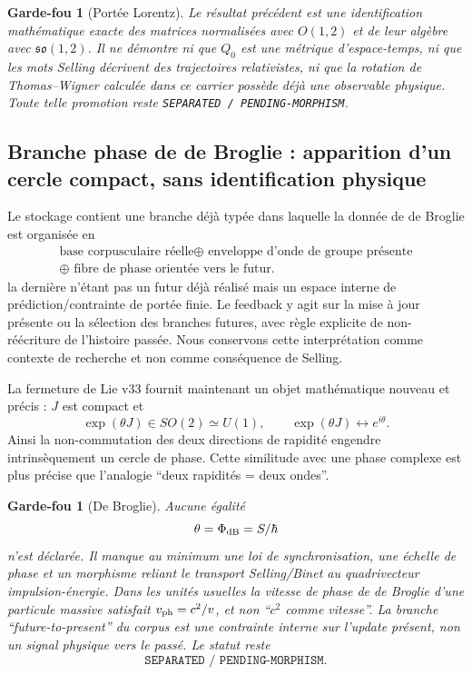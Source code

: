 \documentclass[11pt,a4paper]{article}
\newtheorem{guardrail}[theorem]{Garde-fou}
\begin{document}
\begin{guardrail}[Portée Lorentz]
Le résultat précédent est une identification mathématique exacte des matrices normalisées avec
$O(1,2)$ et de leur algèbre avec $\mathfrak{so}(1,2)$. Il ne démontre ni que $Q_0$ est une métrique
d'espace-temps, ni que les mots Selling décrivent des trajectoires relativistes, ni que la rotation
de Thomas--Wigner calculée dans ce carrier possède déjà une observable physique. Toute telle
promotion reste \texttt{SEPARATED / PENDING-MORPHISM}.
\end{guardrail}

\subsection{Branche phase de de Broglie : apparition d'un cercle compact, sans identification physique}

Le stockage contient une branche déjà typée dans laquelle la donnée de de Broglie est organisée en
\[
 \begin{gathered}
 \text{base corpusculaire réelle}
 \oplus\text{ enveloppe d'onde de groupe présente}\\
 \oplus\text{ fibre de phase orientée vers le futur}.
 \end{gathered}
\]
la dernière n'étant pas un futur déjà réalisé mais un espace interne de prédiction/contrainte de
portée finie. Le feedback y agit sur la mise à jour présente ou la sélection des branches futures,
avec règle explicite de non-réécriture de l'histoire passée. Nous conservons cette interprétation
comme contexte de recherche et non comme conséquence de Selling.

La fermeture de Lie v33 fournit maintenant un objet mathématique nouveau et précis : $J$ est
compact et
\begin{equation}\label{eq:v33-phase-circle}
 \boxed{
 \exp(\theta J)\in SO(2)
 \simeq U(1),
 \qquad
 \exp(\theta J)\longleftrightarrow e^{i\theta}.}
\end{equation}
Ainsi la non-commutation des deux directions de rapidité engendre intrinsèquement un cercle de
phase. Cette similitude avec une phase complexe est plus précise que l'analogie ``deux rapidités =
deux ondes''.

\begin{guardrail}[De Broglie]
Aucune égalité
\[
 \theta=\Phi_{\rm dB}=S/\hbar
\]
n'est déclarée. Il manque au minimum une loi de synchronisation, une échelle de phase et un
morphisme reliant le transport Selling/Binet au quadrivecteur impulsion-énergie. Dans les unités
usuelles la vitesse de phase de de Broglie d'une particule massive satisfait
$v_{\rm ph}=c^2/v$, et non ``$c^2$ comme vitesse''. La branche ``future-to-present'' du corpus est
une contrainte interne sur l'update présent, non un signal physique vers le passé. Le statut reste
\[
 \boxed{\texttt{SEPARATED / PENDING-MORPHISM}.}
\]
\end{guardrail}
\end{document}
